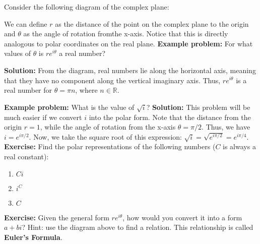 \documentclass[12pt]{article}
\begin{document}
Consider the following diagram of the complex plane:

We can define $r$ as the distance of the point on the complex plane to the origin and $\theta$ as the angle of rotation fromthe x-axis. Notice that this is directly analogous to polar coordinates on the real plane.
\newline\newline
\textbf{Example problem: } For what values of $\theta$ is $re^{i\theta}$ a real number? \\
\begin{mybox}
\textbf{Solution: } From the diagram, real numbers lie along the horizontal axis, meaning that they have no component along the vertical imaginary axis. Thus, $re^{i\theta}$ is a real number for $\theta = \pi n$, where $n \in \mathbb{R}$.
\end{mybox}
\textbf{Example problem: } What is the value of $\sqrt{i}$?
\newline\newline
\textbf{Solution: } This problem will be much easier if we convert $i$ into the polar form. Note that the distance from the origin $r = 1$, while the angle of rotation from the x-axis $\theta = \pi/2 $. Thus, we have $i = e^{i\pi/2}$. Now, we take the square root of this expression: $\sqrt{i} = \sqrt{e^{i\pi/2}} = e^{i\pi/4}$.
\newline\newline
\textbf{Exercise: } Find the polar representations of the following numbers ($C$ is always a real constant):
\begin{enumerate}
    \item $Ci$
    \item $i^C$
    \item $C$
\end{enumerate}
\textbf{Exercise:} Given the general form $re^{i\theta}$, how would you convert it into a form $a + bi$? Hint: use the diagram above to find a relation. This relationship is called \textbf{Euler's Formula}.
\end{document}
